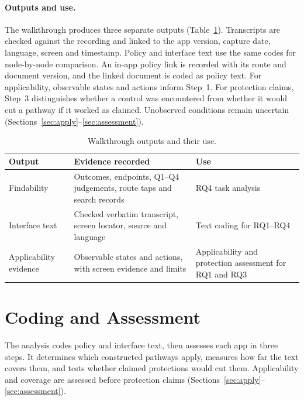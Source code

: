 \paragraph{Outputs and use.} The walkthrough produces three separate outputs
(Table~\ref{tab:wt-outputs}). Transcripts are checked against the recording and linked to the
app version, capture date, language, screen and timestamp. Policy and interface text use the
same codes for node-by-node comparison. An in-app policy link is recorded with its route and
document version, and the linked document is coded as policy text. For applicability,
observable states and actions inform Step~1. For protection claims, Step~3 distinguishes
whether a control was encountered from whether it would cut a pathway if it worked as claimed.
Unobserved conditions remain uncertain (Sections~\ref{sec:apply}--\ref{sec:assessment}).

\begin{table}[H]
\centering
\begin{singlespace}
\caption[Walkthrough outputs and their use]{Walkthrough outputs and their use.}
\label{tab:wt-outputs}
\footnotesize
\begin{tabularx}{\textwidth}{@{}>{\raggedright\arraybackslash}p{3.0cm}>{\raggedright\arraybackslash}X>{\raggedright\arraybackslash}p{4.4cm}@{}}
\toprule
\textbf{Output} & \textbf{Evidence recorded} & \textbf{Use} \\
\midrule
Findability & Outcomes, endpoints, Q1--Q4 judgements, route taps and search records
  & RQ4 task analysis \\
\cmidrule[0.3pt]{2-3}
Interface text & Checked verbatim transcript, screen locator, source and language
  & Text coding for RQ1--RQ4 \\
\cmidrule[0.3pt]{2-3}
Applicability evidence & Observable states and actions, with screen evidence and limits
  & Applicability and protection assessment for RQ1 and RQ3 \\
\bottomrule
\end{tabularx}
\end{singlespace}
\end{table}

\section{Coding and Assessment}
\label{sec:analysis}
The analysis codes policy and interface text, then assesses each app in three steps. It
determines which constructed pathways apply, measures how far the text covers them, and tests
whether claimed protections would cut them. Applicability and coverage are assessed before
protection claims (Sections~\ref{sec:apply}--\ref{sec:assessment}).

